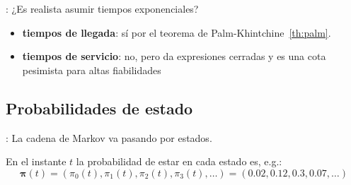\documentclass[xcolor={x11names}]{beamer}
\begin{document}
\begin{frame}{\secname: \subsecname}
    ¿Es realista asumir tiempos exponenciales?
    \begin{itemize}
        \item \textbf{tiempos de llegada}: sí por
            el teorema de
            Palm-Khintchine~\ref{th:palm}.\pause
        \item \textbf{tiempos de servicio}:
            no, pero da expresiones cerradas
            y es una cota pesimista para altas
            fiabilidades
    \end{itemize}

    \vfill

    
    \begin{figure}
        
    \end{figure}
\end{frame}








\subsection{Probabilidades de estado}




\begin{frame}{\secname: \subsecname}
    La cadena de Markov va pasando
    por estados.

    En el instante $t$ la
    probabilidad de estar en cada estado es,
    e.g.:
    \begin{equation*}
        \pmb{\pi}(t) = (\pi_0(t), \pi_1(t), \pi_2(t), \pi_3(t), \ldots) = (0.02, 0.12, 0.3, 0.07, \ldots)
    \end{equation*}

    \begin{figure}
        
    \end{figure}


\end{frame}
\end{document}

